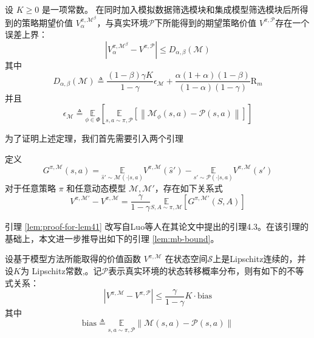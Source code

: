 \begin{theorem}\label{the:MBDP-bound}

设 $K\geq 0$ 是一项常数。 在同时加入模拟数据筛选模块和集成模型筛选模块后所得到的策略期望价值 ${V}_\alpha^{\pi, \mathcal{M}^\beta}$，与真实环境$\mathcal{P}$下所能得到的期望策略价值 ${V}^{\pi, \mathcal{P}}$存在一个误差上界：
\begin{equation}
\left|{V}_\alpha^{\pi, \mathcal{M}^\beta}-{V}^{\pi, \mathcal{P}}\right|\leq D_{\alpha,\beta}(\mathcal{M})
\end{equation}
其中
\begin{equation}\label{eq:MBDP-bound}
D_{\alpha,\beta}(\mathcal{M})\triangleq\frac{(1-\beta)\gamma K}{1-\gamma}\epsilon_{\mathcal{M}}+\frac{\alpha(1+\alpha)(1-\beta)}{(1-\alpha)(1-\gamma)}\mathrm{R}_m
\end{equation}
并且
\begin{equation}\label{def:delta-M}
\epsilon_{\mathcal{M}}\triangleq\underset{\phi\in\Phi}{\mathbb{E}}\left[\underset{s,a\sim \pi,\mathcal{P}}{\mathbb{E}}\left[\left\|\mathcal{M}_\phi(s, a)-\mathcal{P}(s, a)\right\|\right]\right]
\end{equation}

\end{theorem}
为了证明上述定理，我们首先需要引入两个引理

\begin{lemma}\label{lem:proof-for-lem41}
定义
\begin{equation}\label{def:G-sa}
G^{\pi,\mathcal{M}}(s,a)=\underset{\hat{s}'\sim\mathcal{M}(\cdot|s,a)}{\mathbb{E}}{{V}^{\pi,\mathcal{M}}}(\hat{s}') - \underset{s'\sim\mathcal{P}(\cdot|s,a)}{\mathbb{E}}{{V}^{\pi,\mathcal{M}}}(s')
\end{equation}
对于任意策略 $\pi$ 和任意动态模型 $\mathcal{M},\mathcal{M}'$，存在如下关系式
\begin{equation}
{V}^{\pi,\mathcal{M}'} - {V}^{\pi,\mathcal{M}} = \frac{\gamma}{1-\gamma}\underset{S,A\sim\pi,\mathcal{M}}{\mathbb{E}}\left[G^{\pi,\mathcal{M}'}(S,A)\right]
\end{equation}
\end{lemma}

引理 \ref{lem:proof-for-lem41} 改写自Luo等人在其论文\cite{luo2018algorithmic}中提出的引理4.3。在该引理的基础上，本文进一步推导出如下的引理 \ref{lem:mb-bound}。

\begin{lemma}\label{lem:mb-bound}
设基于模型方法所能取得的价值函数 ${V}^{\pi,\mathcal{M}}$ 在状态空间$\mathcal{S}$上是Lipschitz连续的，并设$K$为 Lipschitz常数,。记$\mathcal{P}$表示真实环境的状态转移概率分布，则有如下的不等式关系：
\begin{equation}
\left|{V}^{\pi, \mathcal{M}}-{V}^{\pi, \mathcal{P}}\right| \leq\frac{\gamma}{1-\gamma}K\cdot\mathrm{bias}
\end{equation}
其中
\begin{equation}
\mathrm{bias} \triangleq \underset{s,a\sim \pi,\mathcal{P}}{\mathbb{E}}\left\|\mathcal{M}(s, a)-\mathcal{P}(s, a)\right\|
\end{equation}

\label{theo:mb-bound}
\end{lemma}

